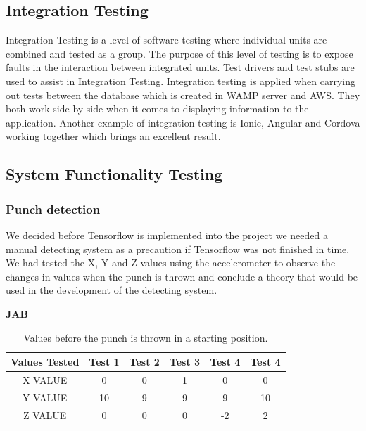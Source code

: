 \documentclass[a4paper,12pt]{report}
\begin{document}
\subsection{Integration Testing}
Integration Testing is a level of software testing where individual units are combined and tested as a group. The purpose of this level of testing is to expose faults in the interaction between integrated units. Test drivers and test stubs are used to assist in Integration Testing.\cite{integrationTesting}
Integration testing is applied when carrying out tests between the database which is created in WAMP server and AWS. They both work side by side when it comes to displaying information to the application. Another example of integration testing is Ionic, Angular and Cordova working together which brings an excellent result.

\subsection{System Functionality Testing}

\subsubsection{Punch detection}
We decided before Tensorflow is implemented into the project we needed a manual detecting system as a precaution if Tensorflow was not finished in time. We had tested the X, Y and Z values using the accelerometer to observe the changes in values when the punch is thrown and conclude a theory that would be used in the development of the detecting system.
\newpage
\begin{center}
    \textbf{JAB}
\end{center}{}
\begin{table}[h]
    \centering
    \begin{tabular}{||c c c c c c||} 
     \hline
     \textbf{Values Tested} & \textbf{Test 1} & \textbf{Test 2} & \textbf{Test 3} & \textbf{Test 4} & \textbf{Test 4} \\ [0.5ex] 
     \hline\hline
     X VALUE & 0 & 0 & 1 & 0 & 0\\ 
     \hline
     Y VALUE & 10 & 9 & 9 & 9 & 10\\  
     \hline
     Z VALUE & 0 & 0 & 0 & -2 & 2\\
     \hline
    \end{tabular}
    \caption{Values before the punch is thrown in a starting position.}
    \label{tab:jabBeforet}
\end{table}
\end{document}
